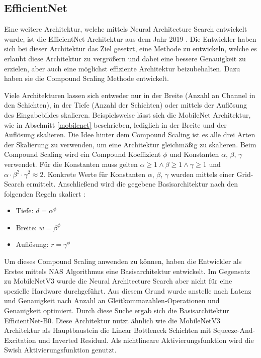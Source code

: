 \subsection{EfficientNet}
\label{efficientnet}
Eine weitere Architektur, welche mittels Neural Architecture Search entwickelt wurde, ist die EfficientNet Architektur aus dem Jahr 2019 \cite{tan_efficientnet_2020}. Die Entwickler haben sich bei dieser Architektur das Ziel gesetzt, eine Methode zu entwickeln, welche es erlaubt diese Architektur zu vergrößern und dabei eine bessere Genauigkeit zu erzielen, aber auch eine möglichst effiziente Architektur beizubehalten. Dazu haben sie die Compound Scaling Methode entwickelt.

Viele Architekturen lassen sich entweder nur in der Breite (Anzahl an Channel in den Schichten), in der Tiefe (Anzahl der Schichten) oder mittels der Auflösung des Eingabebildes skalieren. Beispielsweise lässt sich die MobileNet Architektur, wie in Abschnitt \ref{mobilenet} beschrieben, lediglich in der Breite und der Auflösung skalieren.
Die Idee hinter dem Compound Scaling ist es alle drei Arten der Skalierung zu verwenden, um eine Architektur gleichmäßig zu skalieren. Beim Compound Scaling wird ein Compound Koeffizient $\phi$ und Konstanten $\alpha$, $\beta$, $\gamma$ verwendet. Für die Konstanten muss gelten $\alpha \geq 1 \land \beta \geq 1 \land \gamma \geq 1$ und $\alpha \cdot \beta^2 \cdot \gamma^2 \approx 2$. Konkrete Werte für Konstanten $\alpha$, $\beta$, $\gamma$ wurden mittels einer Grid-Search ermittelt.
Anschließend wird die gegebene Basisarchitektur nach den folgenden Regeln skaliert \cite{tan_efficientnet_2020}:

\begin{itemize}
\item Tiefe: $d = \alpha^\phi$
\item Breite: $w = \beta^\phi$
\item Auflösung: $r = \gamma^\phi$
\end{itemize}

Um dieses Compound Scaling anwenden zu können, haben die Entwickler als Erstes mittels NAS Algorithmus eine Basisarchitektur entwickelt. Im Gegensatz zu MobileNetV3 wurde die Neural Architecture Search aber nicht für eine spezielle Hardware durchgeführt. Aus diesem Grund wurde anstelle nach Latenz und Genauigkeit nach Anzahl an Gleitkommazahlen-Operationen und Genauigkeit optimiert. Durch diese Suche ergab sich die Basisarchitektur EfficientNet-B0. Diese Architektur nutzt ähnlich wie die MobileNetV3 Architektur als Hauptbaustein die Linear Bottleneck Schichten mit Squeeze-And-Excitation und Inverted Residual. Als nichtlineare Aktivierungsfunktion wird die Swish Aktivierungsfunktion genutzt.

